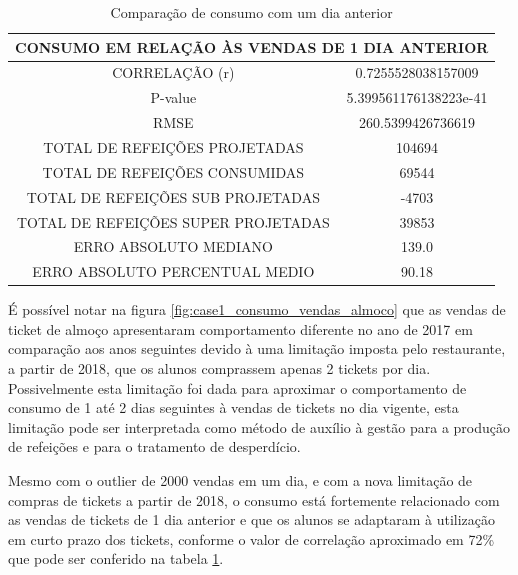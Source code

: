 \documentclass[	12pt, Times, openright, twoside, a4paper, english, brazil]{abntex2}
\begin{document}
                   \begin{table}[!ht]
                   \centering
                   \caption{Comparação de consumo com um dia anterior}
                     \begin{tabular}{|c|c|}\hline
                        \multicolumn{2}{c}{CONSUMO EM RELAÇÃO ÀS VENDAS DE 1 DIA ANTERIOR}\\ \hline
                            CORRELAÇÃO (r) &  0.7255528038157009\\
                            P-value &5.399561176138223e-41\\
                            RMSE & 260.5399426736619\\
                            TOTAL DE REFEIÇÕES PROJETADAS & 104694\\ 
                            TOTAL DE REFEIÇÕES CONSUMIDAS & 69544\\
                            TOTAL DE REFEIÇÕES SUB PROJETADAS & -4703\\
                            TOTAL DE REFEIÇÕES SUPER PROJETADAS & 39853\\
                            ERRO ABSOLUTO MEDIANO & 139.0\\
                            ERRO ABSOLUTO PERCENTUAL MEDIO & 90.18\\\hline
                    \end{tabular} \label{table:case1_vendas1} \end{table}

        	        É possível notar na figura \ref{fig:case1_consumo_vendas_almoco} que as vendas de ticket de almoço apresentaram comportamento diferente no ano de 2017 em comparação aos anos seguintes devido à uma limitação imposta pelo restaurante, a partir de 2018, que os alunos comprassem apenas 2 tickets por dia. Possivelmente esta limitação foi dada para aproximar o comportamento de consumo de 1 até 2 dias seguintes à vendas de tickets no dia vigente, esta limitação pode ser interpretada como método de auxílio à gestão para a produção de refeições e para o tratamento de desperdício.
            	        
        	        Mesmo com o outlier de 2000 vendas em um dia, e com a nova limitação de compras de tickets a partir de 2018, o consumo está fortemente relacionado com as vendas de tickets de 1 dia anterior e que os alunos se adaptaram à utilização em curto prazo dos tickets, conforme o valor de correlação aproximado em 72\% que pode ser conferido na tabela \ref{table:case1_vendas1}.
        	        
\end{document}
